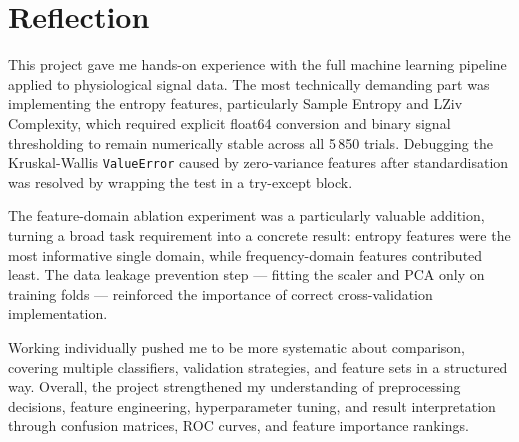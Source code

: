 \documentclass[11pt,a4paper]{article}
\begin{document}
\section{Reflection}

This project gave me hands-on experience with the full machine learning pipeline applied to physiological signal data. The most technically demanding part was implementing the entropy features, particularly Sample Entropy and LZiv Complexity, which required explicit float64 conversion and binary signal thresholding to remain numerically stable across all 5\,850 trials. Debugging the Kruskal-Wallis \texttt{ValueError} caused by zero-variance features after standardisation was resolved by wrapping the test in a try-except block.

The feature-domain ablation experiment was a particularly valuable addition, turning a broad task requirement into a concrete result: entropy features were the most informative single domain, while frequency-domain features contributed least. The data leakage prevention step — fitting the scaler and PCA only on training folds — reinforced the importance of correct cross-validation implementation.

Working individually pushed me to be more systematic about comparison, covering multiple classifiers, validation strategies, and feature sets in a structured way. Overall, the project strengthened my understanding of preprocessing decisions, feature engineering, hyperparameter tuning, and result interpretation through confusion matrices, ROC curves, and feature importance rankings.
\end{document}
